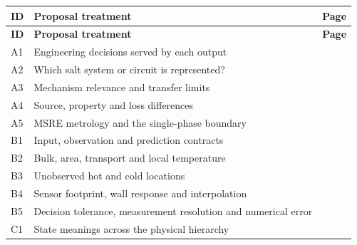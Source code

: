 \begin{longtable}{@{}p{0.45in}p{4.85in}p{0.40in}@{}}
\textbf{ID} & \textbf{Proposal treatment} & \textbf{Page}\\\hline
\endfirsthead
\textbf{ID} & \textbf{Proposal treatment} & \textbf{Page}\\\hline
\endhead
A1 & Engineering decisions served by each output & \hyperref[topic:engineering-decisions-served-by-each-output]{\pageref*{topic:engineering-decisions-served-by-each-output}}\\
A2 & Which salt system or circuit is represented? & \hyperref[topic:which-salt-system-or-circuit-is-represented]{\pageref*{topic:which-salt-system-or-circuit-is-represented}}\\
A3 & Mechanism relevance and transfer limits & \hyperref[topic:mechanism-relevance-and-transfer-limits]{\pageref*{topic:mechanism-relevance-and-transfer-limits}}\\
A4 & Source, property and loss differences & \hyperref[topic:source-property-and-loss-differences]{\pageref*{topic:source-property-and-loss-differences}}\\
A5 & MSRE metrology and the single-phase boundary & \hyperref[topic:msre-metrology-and-the-single-phase-boundary]{\pageref*{topic:msre-metrology-and-the-single-phase-boundary}}\\
B1 & Input, observation and prediction contracts & \hyperref[topic:input-observation-and-prediction-contracts]{\pageref*{topic:input-observation-and-prediction-contracts}}\\
B2 & Bulk, area, transport and local temperature & \hyperref[topic:bulk-area-transport-and-local-temperature]{\pageref*{topic:bulk-area-transport-and-local-temperature}}\\
B3 & Unobserved hot and cold locations & \hyperref[topic:unobserved-hot-and-cold-locations]{\pageref*{topic:unobserved-hot-and-cold-locations}}\\
B4 & Sensor footprint, wall response and interpolation & \hyperref[topic:sensor-footprint-wall-response-and-interpolation]{\pageref*{topic:sensor-footprint-wall-response-and-interpolation}}\\
B5 & Decision tolerance, measurement resolution and numerical error & \hyperref[topic:decision-tolerance-measurement-resolution-and-numerical-error]{\pageref*{topic:decision-tolerance-measurement-resolution-and-numerical-error}}\\
C1 & State meanings across the physical hierarchy & \hyperref[topic:state-meanings-across-the-physical-hierarchy]{\pageref*{topic:state-meanings-across-the-physical-hierarchy}}\\

\end{longtable}
